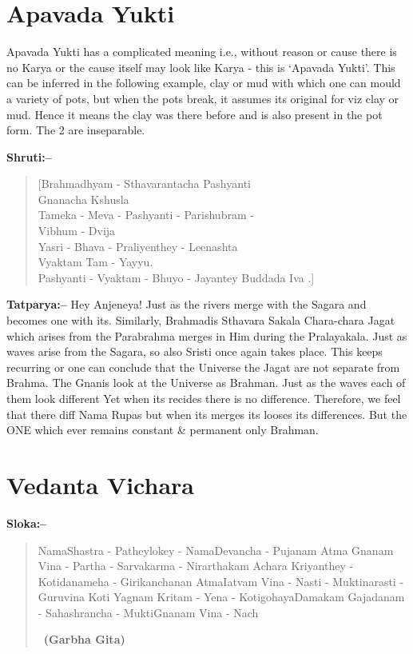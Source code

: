 \chapter{Apavada Yukti}

Apavada Yukti has a complicated meaning i.e., without reason or cause there is no Karya or the cause itself may look like Karya - this is ‘Apavada Yukti’. This can be inferred in the following example, clay or mud with which one can mould a variety of pots, but when the pots break, it assumes its original for viz clay or mud. Hence it means the clay was there before and is also present in the pot form. The 2 are inseparable.

\vskip 10pt

\textbf{Shruti:–}

\begin{verse}
[Brahmadhyam - Sthavarantacha Pashyanti\\ Gnanacha Kshusla \\ Tameka - Meva - Pashyanti - Parishubram -\\ Vibhum - Dvija \\ Yasri - Bhava - Praliyenthey - Leenashta\\ Vyaktam Tam - Yayyu. \\ Pashyanti - Vyaktam - Bhuyo - Jayantey Buddada Iva .]
\end{verse}

\vskip 10pt

\textbf{Tatparya:–} Hey Anjeneya! Just as the rivers merge with the Sagara and becomes one with its. Similarly, Brahmadis Sthavara Sakala Chara-chara Jagat which arises from the Parabrahma merges in Him during the Pralayakala. Just as waves arise from the Sagara, so also Sristi once again takes place. This keeps recurring or one can conclude that the Universe the Jagat are not separate from Brahma. The Gnanis look at the Universe as Brahman. Just as the waves each of them look different Yet when its recides there is no difference. Therefore, we feel that there diff Nama Rupas but when its merges its looses its differences. But the ONE which ever remains constant \& permanent only Brahman.

\chapter{Vedanta Vichara}

\textbf{Sloka:–}

\begin{verse}
NamaShastra - Patheylokey - NamaDevancha - Pujanam  Atma Gnanam Vina - Partha - Sarvakarma - Nirartha\break kam Achara Kriyanthey - Kotidanameha - Girikancha\break nan  AtmaIatvam Vina - Nasti - Muktinarasti - Guru\break vina  Koti Yagnam Kritam - Yena - Kotigohaya\break Damakam  Gajadanam - Sahashrancha - Mukti\break Gnanam Vina - Nach  

~\hfill \textbf{(Garbha Gita)}
\end{verse}

